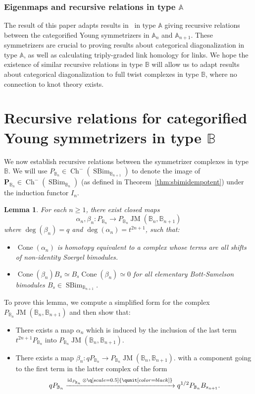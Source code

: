 \documentclass[11pt]{article}
\DeclareMathOperator{\Cone}{Cone}
\DeclareMathOperator{\id}{id}
\DeclareMathOperator{\Ch}{Ch}
\DeclareMathOperator{\SBim}{SBim}
\DeclareMathOperator{\JM}{JM}
\newtheorem{lemma}[thm]{Lemma}
\theoremstyle{definition}
\theoremstyle{remark}
\numberwithin{equation}{section}
\begin{document}
\subsubsection{Eigenmaps and recursive relations in type $\mathbb{A}$}
The result of this paper adapts results in~\cite{elias_computation_2019} in type
$\mathbb{A}$
giving recursive relations between the categorified Young symmetrizers in
$\mathbb{A}_n$ and $\mathbb{A}_{n+1}$.
These symmetrizers are crucial to proving results about
categorical diagonalization in type $\mathbb{A}$, as well as calculating triply-graded
link homology for links. We hope the existence of similar recursive
relations in type $\mathbb{B}$ will allow us to adapt results about categorical
diagonalization to full twist complexes in type $\mathbb{B}$, where no connection to
knot theory exists.
\section{Recursive relations for categorified Young symmetrizers in type $\mathbb{B}$}
\label{sec:recursiverelations}
We now establish recursive relations between the symmetrizer complexes
in type $\mathbb{B}$. We will use $P_{\mathbb{B}_n}\in
\Ch^-(\SBim_{\mathbb{B}_{n+1}})$ to denote the
image of $\mathbf{P}_{\mathbb{B}_n}\in \Ch^-(\SBim_{\mathbb{B}_n})$
(as defined in Theorem~\ref{thm:sbimidempotent}) under the induction functor $I_n$.
\begin{lemma}
	\label{lem:eigenmaps}
	For each $n \geq 1$, there exist closed maps
	\[\alpha_n,\beta_n: P_{\mathbb{B}_n}\to P_{\mathbb{B}_n}
	\JM(\mathbb{B}_n,\mathbb{B}_{n+1})\]
	where $\deg(\beta_n)=q$ and $\deg(\alpha_n)=t^{2n+1}$, such that:
	\begin{itemize}
		\item $\Cone(\alpha_n)$ is homotopy equivalent to
			a complex whose terms are all shifts of
			non-identity Soergel bimodules.
		\item $\Cone(\beta_n)B_s\simeq B_s\Cone(\beta_n)\simeq 0$
			for all elementary Bott-Samelson bimodules
			$B_s\in \SBim_{\mathbb{B}_{n+1}}$.
	\end{itemize}
\end{lemma}
\noindent To prove this lemma,
 we compute a simplified form for the complex
 $P_{\mathbb{B}_n}\JM(\mathbb{B}_n,\mathbb{B}_{n+1})$ and then show that:
\begin{itemize}
	\item There exists a map $\alpha_n$ which is induced by the inclusion of
		the last term $t^{2n+1}P_{\mathbb{B}_n}$ into
		$P_{\mathbb{B}_n}\JM(\mathbb{B}_n,\mathbb{B}_{n+1})$.
	\item There exists a map $\beta_n:qP_{\mathbb{B}_n}
		\to P_{\mathbb{B}_n}\JM(\mathbb{B}_{n},\mathbb{B}_{n+1})$.
		with a component going to the first term in the latter
		complex of the form
		\[qP_{\mathbb{B}_n} \xrightarrow{\id_{P_{\mathbb{B}_n}} \otimes
		\q[scale=0.5]{\qunit[color=black]}} q^{1/2}P_{\mathbb{B}_n}
	B_{s_{n+1}}.\]
\end{itemize}
\end{document}
